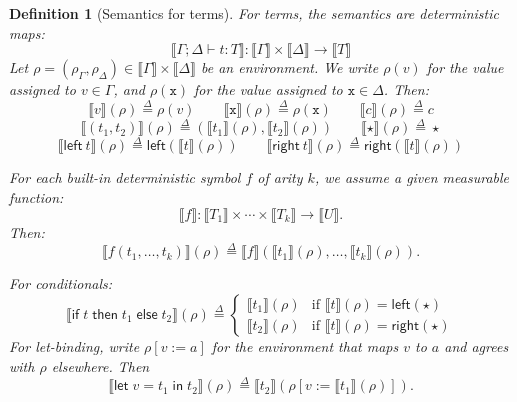 \documentclass[preprint]{uai2026} %
\newtheorem{definition}{Definition}
\newcommand{\sem}[1]{\llbracket #1 \rrbracket}
\newcommand{\df}{\overset{\Delta}{=}}
\newcommand{\ifte}[3]{\mathsf{if}\;#1\;\mathsf{then}\;#2\;\mathsf{else}\;#3}
\newcommand{\letin}[3]{\mathsf{let}\;#1=#2\;\mathsf{in}\;#3}
\newcommand{\datavar}[1]{\mathtt{#1}}
\begin{document}
\begin{definition}[Semantics for terms]\label{def:sem-terms}
For terms, the semantics are deterministic maps:
\[
\sem{\Gamma;\Delta \vdash t:T}: \sem{\Gamma}\times \sem{\Delta}\to \sem{T} 
\]
Let $\rho=(\rho_\Gamma,\rho_\Delta)\in\sem{\Gamma}\times\sem{\Delta}$ be an environment.
We write $\rho(v)$ for the value assigned to $v\in\Gamma$, and $\rho(\datavar{x})$ for the value assigned to $\datavar{x}\in\Delta$.
Then:
\[
\sem{v}(\rho) \df \rho(v)
\qquad
\sem{\datavar{x}}(\rho) \df \rho(\datavar{x})
\qquad
\sem{c}(\rho) \df c
\]
\[
\sem{(t_1,t_2)}(\rho) \df (\sem{t_1}(\rho),\sem{t_2}(\rho))
\qquad
\sem{\star}(\rho) \df \star
\]
\[
\sem{\mathsf{left}\ t}(\rho) \df \mathsf{left}(\sem{t}(\rho))
\qquad
\sem{\mathsf{right}\ t}(\rho) \df \mathsf{right}(\sem{t}(\rho))
\]

For each built-in deterministic symbol $f$ of arity $k$, we assume a given measurable function:
\[
\sem{f}: \sem{T_1}\times \cdots \times \sem{T_k} \to \sem{U}.
\]
Then:
\[
\sem{f(t_1,\ldots,t_k)}(\rho) \df \sem{f}(\sem{t_1}(\rho),\ldots,\sem{t_k}(\rho)).
\]

For conditionals:
\[
\sem{\ifte{t}{t_1}{t_2}}(\rho) \df
\begin{cases}
\sem{t_1}(\rho) & \text{if }\sem{t}(\rho)=\mathsf{left}(\star)\\
\sem{t_2}(\rho) & \text{if }\sem{t}(\rho)=\mathsf{right}(\star)
\end{cases}
\]
For let-binding, write $\rho[v := a]$ for the environment that maps $v$ to $a$ and agrees with $\rho$ elsewhere.
Then
\[
\sem{\letin{v}{t_1}{t_2}}(\rho) \df \sem{t_2}(\rho[v := \sem{t_1}(\rho)]).
\]
\end{definition}
\end{document}
